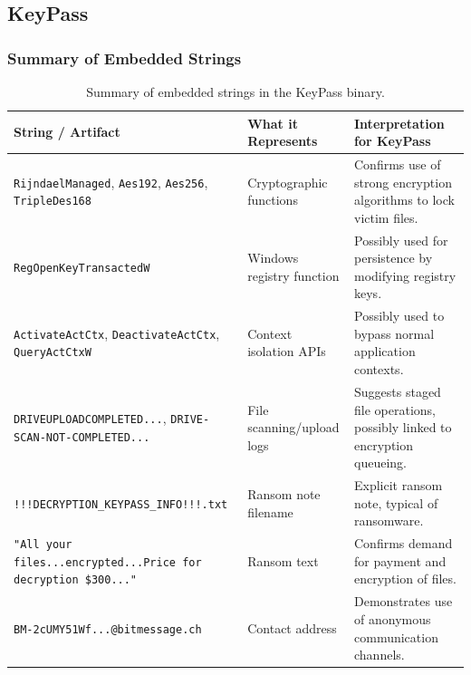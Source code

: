 \documentclass{article}
\begin{document}
\subsection{KeyPass}

\subsubsection{Summary of Embedded Strings}
\begin{table}[H]
  \centering
  \begin{tabular}{|p{6cm}|p{2cm}|p{5cm}|}
    \hline
    \textbf{String / Artifact} & \textbf{What it Represents} & \textbf{Interpretation for KeyPass} \\
    \hline
    \texttt{RijndaelManaged}, \texttt{Aes192}, \texttt{Aes256}, \texttt{TripleDes168} & Cryptographic functions & Confirms use of strong encryption algorithms to lock victim files. \\
    \hline
    \texttt{RegOpenKeyTransactedW} & Windows registry function & Possibly used for persistence by modifying registry keys. \\
    \hline
    \texttt{ActivateActCtx}, \texttt{DeactivateActCtx}, \texttt{QueryActCtxW} & Context isolation APIs & Possibly used to bypass normal application contexts. \\
    \hline
    \texttt{DRIVEUPLOADCOMPLETED...}, \texttt{DRIVE-SCAN-NOT-COMPLETED...} & File scanning/upload logs & Suggests staged file operations, possibly linked to encryption queueing. \\
    \hline
    \texttt{!!!DECRYPTION\_KEYPASS\_INFO!!!.txt} & Ransom note filename & Explicit ransom note, typical of ransomware. \\
    \hline
    \texttt{"All your files...encrypted...Price for decryption \$300..."} & Ransom text & Confirms demand for payment and encryption of files. \\
    \hline
    \texttt{BM-2cUMY51Wf...@bitmessage.ch} & Contact address & Demonstrates use of anonymous communication channels. \\
    \hline
  \end{tabular}
  \caption{Summary of embedded strings in the KeyPass binary.}
  \label{tab:keypass-strings}
\end{table}
\end{document}
